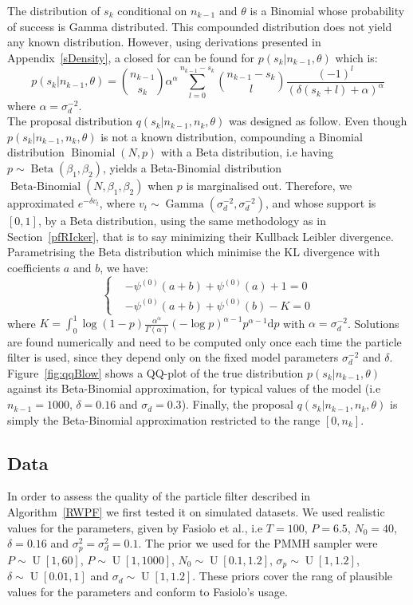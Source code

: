 \documentclass[12pt]{article}
\begin{document}
	The distribution of $s_k$ conditional on $n_{k-1}$ and $\theta$ is a Binomial whose probability of success is Gamma distributed. This compounded distribution does not yield any known distribution. However, using derivations presented in Appendix~\ref{sDensity}, a closed for can be found for $p(s_k|n_{k-1}, \theta)$ which is:
	\begin{equation*}
	p(s_k|n_{k-1}, \theta) = \binom{n_{k-1}}{s_k}\alpha^\alpha\sum_{l=0}^{n_{k-1}-s_k}\binom{n_{k-1}-s_k}{l}\frac{(-1)^l}{(\delta(s_k+l)+\alpha)^\alpha}
	\end{equation*}
	where $\alpha = \sigma_d^{-2}$. \\
	
	The proposal distribution $q(s_k|n_{k-1}, n_k, \theta)$ was designed as follow. Even though $p(s_k|n_{k-1}, n_k, \theta)$ is not a known distribution, compounding a Binomial distribution $\operatorname{Binomial}(N, p)$ with a Beta distribution, i.e having $p \sim \operatorname{Beta}(\beta_1,  \beta_2)$, yields a Beta-Binomial distribution $\operatorname{Beta-Binomial}(N, \beta_1, \beta_2)$ when $p$ is marginalised out. Therefore, we approximated $e^{-\delta v_t}$, where $v_t \sim \operatorname{Gamma}(\sigma_d^{-2}, \sigma_d^{-2})$, and whose support is $[0, 1]$, by a Beta distribution, using the same methodology as in Section~\ref{pfRIcker}, that is to say minimizing their Kullback Leibler divergence. Parametrising the Beta distribution which minimise the KL divergence with coefficients $a$ and $b$, we have:
	\[	\begin{cases}
	& -\psi^{(0)}(a+b) + \psi^{(0)}(a) + 1 = 0 \\
	& -\psi^{(0)}(a+b) + \psi^{(0)}(b) - K  = 0
	\end{cases}\]
	where $K=\int_{0}^{1}\log(1-p)\frac{\alpha^\alpha}{\Gamma(\alpha)}(-\log p)^{\alpha-1}p^{\alpha-1}\mathrm{d}p$ with $\alpha = \sigma_d^{-2}$. Solutions are found numerically and need to be computed only once each time the particle filter is used, since they depend only on the fixed model parameters $\sigma_d^{-2}$ and $\delta$. Figure~\ref{fig:qqBlow} shows a QQ-plot of the true distribution $p(s_k|n_{k-1}, \theta)$ against its Beta-Binomial approximation, for typical values of the model (i.e $n_{k-1} = 1000$, $\delta=0.16$ and $\sigma_d=0.3$). Finally, the proposal $q(s_k|n_{k-1}, n_k, \theta)$ is simply the Beta-Binomial approximation restricted to the range $[0, n_k]$.
	
	\subsection{Data}
	In order to assess the quality of the particle filter described in Algorithm~\ref{RWPF} we first tested it on simulated datasets. We used realistic values for the parameters, given by Fasiolo et al.\cite{fasiolo2014statistical}, i.e $T=100$, $P=6.5$, $N_0=40$, $\delta=0.16$ and $\sigma_p^2=\sigma_d^2=0.1$. The prior we used for the PMMH sampler were $P\sim\operatorname{U}[1, 60]$, $P\sim\operatorname{U}[1, 1000]$, $N_0\sim\operatorname{U}[0.1, 1.2]$, $\sigma_p\sim\operatorname{U}[1, 1.2]$, $\delta\sim\operatorname{U}[0.01, 1]$ and $\sigma_d\sim\operatorname{U}[1, 1.2]$. These priors cover the rang of plausible values for the parameters and conform to Fasiolo's usage.
	
\end{document}
